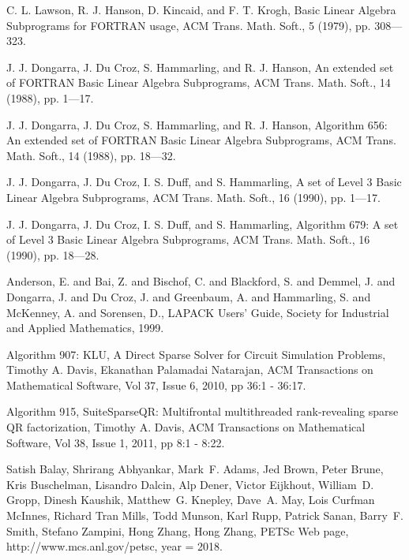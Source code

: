 \begin{thebibliography}{99}

    C. L. Lawson, R. J. Hanson, D. Kincaid, and F. T. Krogh, Basic Linear Algebra Subprograms for FORTRAN
    usage, ACM Trans. Math. Soft., 5 (1979), pp. 308—323.

    J. J. Dongarra, J. Du Croz, S. Hammarling, and R. J. Hanson, An extended set of FORTRAN Basic Linear
    Algebra Subprograms, ACM Trans. Math. Soft., 14 (1988), pp. 1—17.

    J. J. Dongarra, J. Du Croz, S. Hammarling, and R. J. Hanson, Algorithm 656: An extended set of FORTRAN
    Basic Linear Algebra Subprograms, ACM Trans. Math. Soft., 14 (1988), pp. 18—32.

    J. J. Dongarra, J. Du Croz, I. S. Duff, and S. Hammarling, A set of Level 3 Basic Linear Algebra
    Subprograms, ACM Trans. Math. Soft., 16 (1990), pp. 1—17.

    J. J. Dongarra, J. Du Croz, I. S. Duff, and S. Hammarling, Algorithm 679: A set of Level 3 Basic Linear
    Algebra Subprograms, ACM Trans. Math. Soft., 16 (1990), pp. 18—28.

    {Anderson, E. and Bai, Z. and Bischof, C. and Blackford, S. and Demmel, J. and Dongarra, J. and
    Du Croz, J. and Greenbaum, A. and Hammarling, S. and McKenney, A. and Sorensen, D.},
    {{LAPACK} Users' Guide}, {Society for Industrial and Applied Mathematics}, {1999}.

    Algorithm 907: KLU, A Direct Sparse Solver for Circuit Simulation Problems, Timothy A. Davis, Ekanathan
    Palamadai Natarajan, ACM Transactions on Mathematical Software, Vol 37, Issue 6, 2010, pp 36:1 -
    36:17.

    Algorithm 915, SuiteSparseQR: Multifrontal multithreaded rank-revealing sparse QR factorization, Timothy
    A. Davis, ACM Transactions on Mathematical Software, Vol 38, Issue 1, 2011, pp 8:1 - 8:22.

    {Satish Balay,  Shrirang Abhyankar,  Mark~F. Adams,  Jed Brown,  Peter Brune,  Kris Buschelman,  Lisandro
        Dalcin,  Alp Dener,  Victor Eijkhout,  William~D. Gropp,  Dinesh Kaushik,  Matthew~G. Knepley,
        Dave~A. May, Lois Curfman McInnes, Richard Tran Mills, Todd Munson,  Karl Rupp,  Patrick Sanan,
        Barry~F. Smith,  Stefano Zampini,  Hong Zhang,  Hong Zhang}, {{PETS}c {W}eb page},
        {http://www.mcs.anl.gov/petsc}, year = {2018}.


\end{thebibliography}
